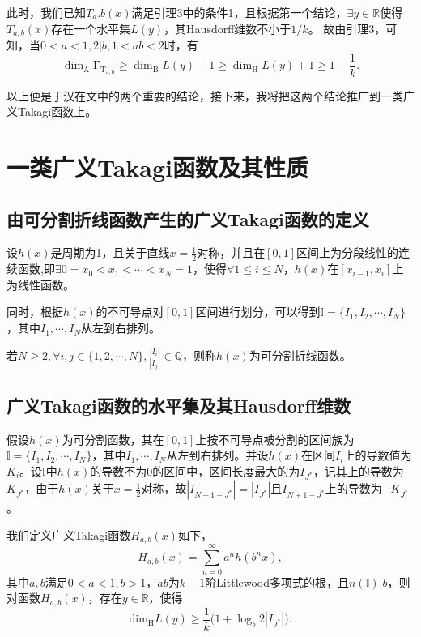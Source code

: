 此时，我们已知$T_a.b(x)$满足引理3中的条件1，且根据第一个结论，$\exists y\in\mathbb{R}$使得$T_{a,b}(x)$存在一个水平集$L(y)$，其Hausdorff维数不小于$1/k$。
故由引理3，可知，当$0<a<1,2|b,1<ab<2$时，有
$$
      \mathrm{\dim_A\Gamma_{T_{a,b}}}\ge\mathrm{\dim_B}L(y)+1\ge\mathrm{\dim_H}L(y)+1\ge1+\frac{1}{k}.
$$

以上便是于汉在文中的两个重要的结论，接下来，我将把这两个结论推广到一类广义Takagi函数上。


\newpage

\section{一类广义Takagi函数及其性质}

\subsection{由可分割折线函数产生的广义Takagi函数的定义}

设$h(x)$是周期为1，且关于直线$x=\frac{1}{2}$对称，并且在$[0,1]$区间上为分段线性的连续函数,即$\exists0=x_0<x_1<\cdots<x_N=1$，使得$\forall 1\le i\le N$，$h(x)$在$[x_{i-1},x_i]$上为线性函数。

同时，根据$h(x)$的不可导点对$[0,1]$区间进行划分，可以得到$\mathbb{I}=\{I_1,I_2,\cdots,I_N\}$，其中$I_1,\cdots,I_N$从左到右排列。

若$N\ge2,\forall i,j\in\{1,2,\cdots,N\},\frac{|I_i|}{|I_j|}\in\mathbb{Q}$，则称$h(x)$为可分割折线函数。



\subsection{广义Takagi函数的水平集及其Hausdorff维数}

假设$h(x)$为可分割函数，其在$[0,1]$上按不可导点被分割的区间族为$\mathbb{I}=\{I_1,I_2,\cdots,I_N\}$，其中$I_1,\cdots,I_N$从左到右排列。并设$h(x)$在区间$I_i$上的导数值为$K_i$。设$\mathbb{I}$中$h(x)$的导数不为$0$的区间中，区间长度最大的为$I_{J^*}$，记其上的导数为$K_{J^*}$，由于$h(x)$关于$x=\frac{1}{2}$对称，故$|I_{N+1-J^*}|=|I_{J^*}|$且$I_{N+1-J^*} $上的导数为$-K_{J^*}$。

我们定义广义Takagi函数$H_{a,b}(x)$如下，
$$
      H_{a,b}(x)=\sum_{n=0}^\infty a^nh(b^nx),
$$
其中$a,b$满足$0<a<1,b>1$，$ab$为$k-1$阶Littlewood多项式的根，且$n(\mathbb{I})|b$，则对函数$H_{a,b}(x)$，存在$y\in\mathbb{R}$，使得
$$
      \mathrm{dim_H}L(y)\ge\frac{1}{k}\Big(1+\log_b2|I_{J^*}|\Big).
$$

